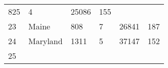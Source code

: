 \documentclass[]{article}
\begin{document}
\begin{longtable}[]{@{}llllll@{}}
\begin{minipage}[t]{0.16\columnwidth}
825\strut
\end{minipage} & \begin{minipage}[t]{0.12\columnwidth}\raggedright
4\strut
\end{minipage} & \begin{minipage}[t]{0.18\columnwidth}\raggedright
25086\strut
\end{minipage} & \begin{minipage}[t]{0.14\columnwidth}\raggedright
155\strut
\end{minipage}\tabularnewline
\begin{minipage}[t]{0.05\columnwidth}\raggedright
23\strut
\end{minipage} & \begin{minipage}[t]{0.17\columnwidth}\raggedright
Maine\strut
\end{minipage} & \begin{minipage}[t]{0.16\columnwidth}\raggedright
808\strut
\end{minipage} & \begin{minipage}[t]{0.12\columnwidth}\raggedright
7\strut
\end{minipage} & \begin{minipage}[t]{0.18\columnwidth}\raggedright
26841\strut
\end{minipage} & \begin{minipage}[t]{0.14\columnwidth}\raggedright
187\strut
\end{minipage}\tabularnewline
\begin{minipage}[t]{0.05\columnwidth}\raggedright
24\strut
\end{minipage} & \begin{minipage}[t]{0.17\columnwidth}\raggedright
Maryland\strut
\end{minipage} & \begin{minipage}[t]{0.16\columnwidth}\raggedright
1311\strut
\end{minipage} & \begin{minipage}[t]{0.12\columnwidth}\raggedright
5\strut
\end{minipage} & \begin{minipage}[t]{0.18\columnwidth}\raggedright
37147\strut
\end{minipage} & \begin{minipage}[t]{0.14\columnwidth}\raggedright
152\strut
\end{minipage}\tabularnewline
\begin{minipage}[t]{0.05\columnwidth}\raggedright
25\strut
\end{minipage} & \begin{minipage}[t]{0.17\columnwidth}\raggedright

\end{minipage}
\end{longtable}
\end{document}
